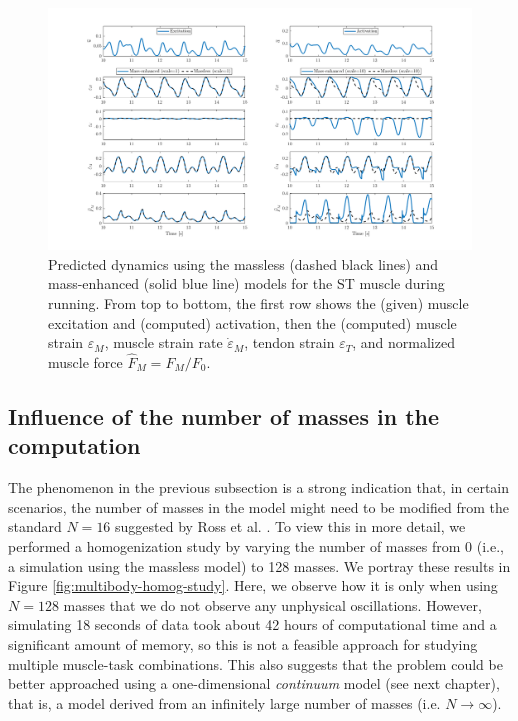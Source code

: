 \documentclass{sfuthesis}
\numberwithin{equation}{chapter}
\numberwithin{figure}{chapter}
\numberwithin{table}{chapter}
\theoremstyle{definition}
\newcommand{\depsilon}{\dot{\varepsilon}}
\begin{document}
\begin{figure} 
    \centering
    \hspace*{-5.5em}\includegraphics[width=1.25\textwidth]{st-running-strains-strain-rates-forces.png}
    \caption{Predicted dynamics using the massless (dashed black lines) and mass-enhanced (solid blue line) models for the ST muscle during running. From top to bottom, the first row shows the (given) muscle excitation and (computed) activation, then the (computed) muscle strain $\varepsilon_M$, muscle strain rate $\depsilon_M$, tendon strain $\varepsilon_T$, and normalized muscle force $\widehat{F}_M = F_M/F_0$.}
    \label{fig:multibody_traces_ST_running}
\end{figure}

\subsection{Influence of the number of masses in the computation}

The phenomenon in the previous subsection is a strong indication that, in certain scenarios, the number of masses in the model might need to be modified from the standard $N=16$ suggested by Ross et al. \cite{Ross2018-1D}. To view this in more detail, we performed a homogenization study by varying the number of masses from 0 (i.e., a simulation using the massless model) to 128 masses. We portray these results in Figure \ref{fig:multibody-homog-study}. Here, we observe how it is only when using $N=128$ masses that we do not observe any unphysical oscillations. However, simulating 18 seconds of data took about 42 hours of computational time and a significant amount of memory, so this is not a feasible approach for studying multiple muscle-task combinations. This also suggests that the problem could be better approached using a one-dimensional \textit{continuum} model (see next chapter), that is, a model derived from an infinitely large number of masses (i.e. $N \to \infty$).
\end{document}
